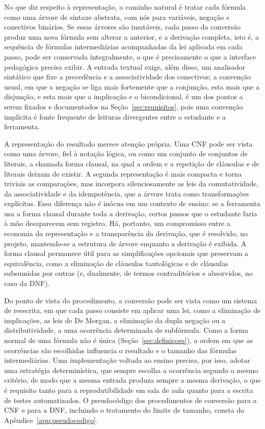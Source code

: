 \documentclass[12pt,a4paper,oneside]{report}
\theoremstyle{tituloplain}
\theoremstyle{titulodef}
\begin{document}
No que diz respeito à representação, o caminho natural é tratar cada fórmula como uma árvore de sintaxe abstrata, com nós para variáveis, negação e conectivos binários. Se essas árvores são imutáveis, cada passo da conversão produz uma nova fórmula sem alterar a anterior, e a derivação completa, isto é, a sequência de fórmulas intermediárias acompanhadas da lei aplicada em cada passo, pode ser conservada integralmente, o que é precisamente o que a interface pedagógica precisa exibir. A entrada textual exige, além disso, um analisador sintático que fixe a precedência e a associatividade dos conectivos; a convenção usual, em que a negação se liga mais fortemente que a conjunção, esta mais que a disjunção, e esta mais que a implicação e o bicondicional, é um dos pontos a serem fixados e documentados na Seção~\ref{sec:requisitos}, pois uma convenção implícita é fonte frequente de leituras divergentes entre o estudante e a ferramenta.

A representação do resultado merece atenção própria. Uma CNF pode ser vista como uma árvore, fiel à notação lógica, ou como um conjunto de conjuntos de literais, a chamada forma clausal, na qual a ordem e a repetição de cláusulas e de literais deixam de existir. A segunda representação é mais compacta e torna triviais as comparações, mas incorpora silenciosamente as leis da comutatividade, da associatividade e da idempotência, que a árvore trata como transformações explícitas. Essa diferença não é inócua em um contexto de ensino: se a ferramenta usa a forma clausal durante toda a derivação, certos passos que o estudante faria à mão desaparecem sem registro. Há, portanto, um compromisso entre a economia da representação e a transparência da derivação, que é resolvido, no projeto, mantendo-se a estrutura de árvore enquanto a derivação é exibida. A forma clausal permanece útil para as simplificações opcionais que preservam a equivalência, como a eliminação de cláusulas tautológicas e de cláusulas subsumidas por outras (e, dualmente, de termos contraditórios e absorvidos, no caso da DNF).

Do ponto de vista do procedimento, a conversão pode ser vista como um sistema de reescrita, em que cada passo consiste em aplicar uma lei, como a eliminação de implicações, as leis de De Morgan, a eliminação da dupla negação ou a distributividade, a uma ocorrência determinada de subfórmula. Como a forma normal de uma fórmula não é única (Seção~\ref{sec:definicoes}), a ordem em que as ocorrências são escolhidas influencia o resultado e o tamanho das fórmulas intermediárias. Uma implementação voltada ao ensino precisa, por isso, adotar uma estratégia determinística, que sempre escolha a ocorrência segundo o mesmo critério, de modo que a mesma entrada produza sempre a mesma derivação, o que é requisito tanto para a reprodutibilidade em sala de aula quanto para a escrita de testes automatizados. O pseudocódigo dos procedimentos de conversão para a CNF e para a DNF, incluindo o tratamento do limite de tamanho, consta do Apêndice~\ref{app:pseudocodigo}.
\end{document}
